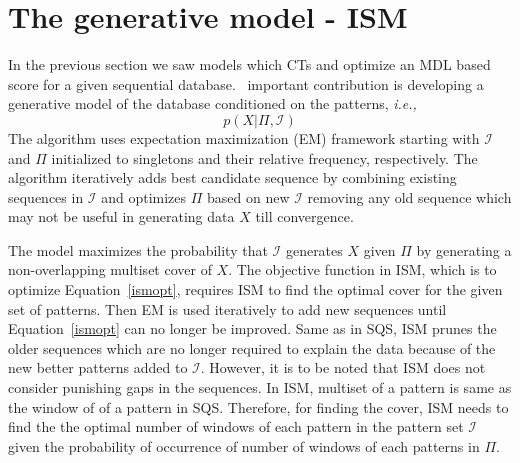 \documentclass[10pt]{article}
\begin{document}
\section{The generative model - ISM}
\par In the previous section we saw models which CTs and optimize an MDL based score for a given sequential database.~\citet{fowkes2016subsequence} important contribution is developing a generative model of the database conditioned on the patterns, \emph{i.e.,}
\begin{equation}\label{ismopt}
p(X|\Pi,\mathcal{I})
\end{equation} The algorithm uses expectation maximization (EM) framework starting with $\mathcal{I}$ and $\Pi$ initialized to singletons and their relative frequency, respectively. The algorithm iteratively adds best candidate sequence by combining existing sequences in $\mathcal{I}$ and optimizes $\Pi$ based on new $\mathcal{I}$ removing any old sequence which may not be useful in generating data $X$ till convergence. 
\par The model maximizes the probability that $\mathcal{I}$ generates $X$ given $\Pi$ by generating a non-overlapping multiset cover of $X$. The objective function in ISM, which is to optimize Equation~\eqref{ismopt}, requires ISM to find the optimal cover for the given set of patterns. Then EM is used iteratively to add new sequences until Equation~\eqref{ismopt} can no longer be improved. Same as in SQS, ISM prunes the older sequences which are no longer required to explain the data because of the new better patterns added to $\mathcal{I}$. However, it is to be noted that ISM does not consider punishing gaps in the sequences. In ISM, multiset of a pattern is same as the window of of a pattern in SQS. Therefore, for finding the cover, ISM needs to find the the optimal number of windows of each pattern in the pattern set $\mathcal{I}$ given the probability of occurrence of number of windows of each patterns in $\Pi$. 
\end{document}
